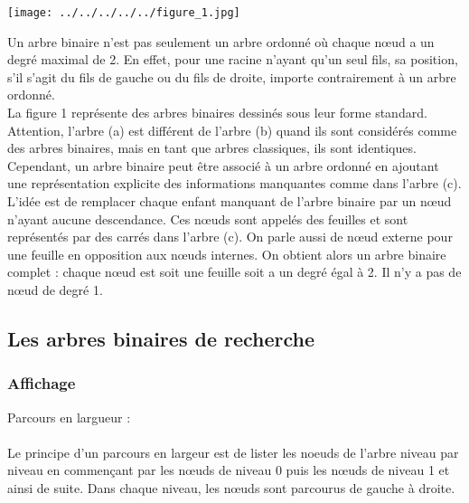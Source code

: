 \documentclass{report}
\begin{document}
\begin{center}
\texttt{[image: ../../../../../figure\_1.jpg]} 
\label{fig1}
\end{center} 

Un arbre binaire n'est pas seulement un arbre ordonné où chaque nœud a un degré maximal de 2.  En effet, pour une racine n'ayant qu'un seul fils, sa position, s'il s'agit du fils de gauche ou du fils de droite, importe contrairement à un arbre ordonné.\\
La figure 1 représente des arbres binaires dessinés sous leur forme standard. Attention, l'arbre (a) est différent de l'arbre (b) quand ils sont considérés comme des arbres binaires, mais en tant que arbres classiques, ils sont identiques.\\
Cependant, un arbre binaire peut être associé à un arbre ordonné en ajoutant une représentation explicite des informations manquantes comme dans l'arbre (c). L'idée est de remplacer chaque enfant manquant de l'arbre binaire par un nœud n'ayant aucune descendance. Ces nœuds sont appelés des feuilles et sont représentés par des carrés dans l'arbre (c). On parle aussi de nœud externe pour une feuille en opposition aux nœuds internes. On obtient alors un arbre binaire complet : chaque nœud est soit une feuille soit a un degré égal à 2. Il n'y a pas de nœud de degré 1.\\


\subsection{Les arbres binaires de recherche}
\subsubsection{Affichage}

Parcours en largueur : \\
~\\
Le principe d'un parcours en largeur est de lister les noeuds de l'arbre niveau par niveau en commençant par les nœuds de niveau 0 puis les nœuds de niveau 1 et ainsi de suite. Dans chaque niveau, les nœuds sont parcourus de gauche à droite.\\ 

\end{document}
